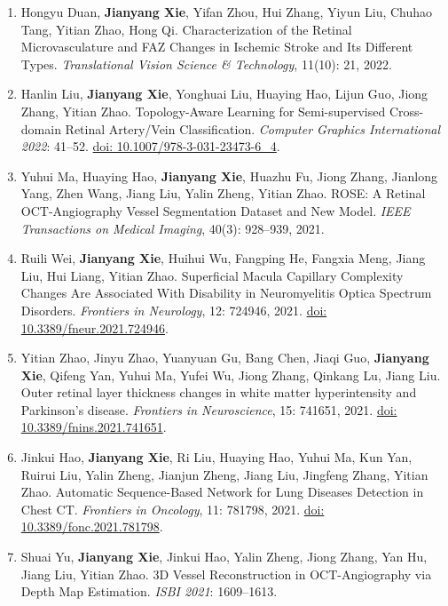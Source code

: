 \documentclass[11pt,a4paper]{article}
\begin{document}
\begin{enumerate}[label={\textcolor{accent}{\sffamily\footnotesize O\arabic*}},leftmargin=2.5em,itemsep=8pt,parsep=0pt]
\item Hongyu Duan, \textbf{Jianyang Xie}, Yifan Zhou, Hui Zhang, Yiyun Liu, Chuhao Tang, Yitian Zhao, Hong Qi. Characterization of the Retinal Microvasculature and FAZ Changes in Ischemic Stroke and Its Different Types. \textit{Translational Vision Science \& Technology}, 11(10): 21, 2022.
\item Hanlin Liu, \textbf{Jianyang Xie}, Yonghuai Liu, Huaying Hao, Lijun Guo, Jiong Zhang, Yitian Zhao. Topology-Aware Learning for Semi-supervised Cross-domain Retinal Artery/Vein Classification. \textit{Computer Graphics International 2022}: 41--52. \href{https://doi.org/10.1007/978-3-031-23473-6_4}{doi: 10.1007/978-3-031-23473-6\_4}.
\item Yuhui Ma, Huaying Hao, \textbf{Jianyang Xie}, Huazhu Fu, Jiong Zhang, Jianlong Yang, Zhen Wang, Jiang Liu, Yalin Zheng, Yitian Zhao. ROSE: A Retinal OCT-Angiography Vessel Segmentation Dataset and New Model. \textit{IEEE Transactions on Medical Imaging}, 40(3): 928--939, 2021.
\item Ruili Wei, \textbf{Jianyang Xie}, Huihui Wu, Fangping He, Fangxia Meng, Jiang Liu, Hui Liang, Yitian Zhao. Superficial Macula Capillary Complexity Changes Are Associated With Disability in Neuromyelitis Optica Spectrum Disorders. \textit{Frontiers in Neurology}, 12: 724946, 2021. \href{https://doi.org/10.3389/fneur.2021.724946}{doi: 10.3389/fneur.2021.724946}.
\item Yitian Zhao, Jinyu Zhao, Yuanyuan Gu, Bang Chen, Jiaqi Guo, \textbf{Jianyang Xie}, Qifeng Yan, Yuhui Ma, Yufei Wu, Jiong Zhang, Qinkang Lu, Jiang Liu. Outer retinal layer thickness changes in white matter hyperintensity and Parkinson's disease. \textit{Frontiers in Neuroscience}, 15: 741651, 2021. \href{https://doi.org/10.3389/fnins.2021.741651}{doi: 10.3389/fnins.2021.741651}.
\item Jinkui Hao, \textbf{Jianyang Xie}, Ri Liu, Huaying Hao, Yuhui Ma, Kun Yan, Ruirui Liu, Yalin Zheng, Jianjun Zheng, Jiang Liu, Jingfeng Zhang, Yitian Zhao. Automatic Sequence-Based Network for Lung Diseases Detection in Chest CT. \textit{Frontiers in Oncology}, 11: 781798, 2021. \href{https://doi.org/10.3389/fonc.2021.781798}{doi: 10.3389/fonc.2021.781798}.
\item Shuai Yu, \textbf{Jianyang Xie}, Jinkui Hao, Yalin Zheng, Jiong Zhang, Yan Hu, Jiang Liu, Yitian Zhao. 3D Vessel Reconstruction in OCT-Angiography via Depth Map Estimation. \textit{ISBI 2021}: 1609--1613.

\end{enumerate}
\end{document}
